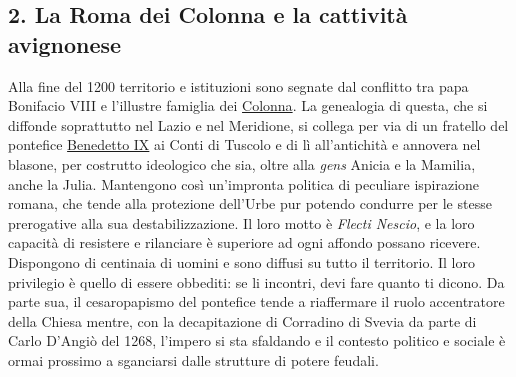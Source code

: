 \documentclass[
  letterpaper,
  DIV=11,
  numbers=noendperiod]{scrartcl}
\begin{document}
\hypertarget{la-roma-dei-colonna-e-la-cattivituxe0-avignonese}{%
\subsection{2. La Roma dei Colonna e la cattività
avignonese}\label{la-roma-dei-colonna-e-la-cattivituxe0-avignonese}}

Alla fine del 1200 territorio e istituzioni sono segnate dal conflitto
tra papa Bonifacio VIII e l'illustre famiglia dei
\href{2015-12-15-marcantonio-colonna-frascati-comandini.html}{Colonna}.
La genealogia di questa, che si diffonde soprattutto nel Lazio e nel
Meridione, si collega per via di un fratello del pontefice
\href{2013-04-02-benedetto-ix-tuscolo-comandini.html}{Benedetto IX} ai
Conti di Tuscolo e di lì all'antichità e annovera nel blasone, per
costrutto ideologico che sia, oltre alla \emph{gens} Anicia e la
Mamilia, anche la Julia. Mantengono così un'impronta politica di
peculiare ispirazione romana, che tende alla protezione dell'Urbe pur
potendo condurre per le stesse prerogative alla sua destabilizzazione.
Il loro motto è \emph{Flecti Nescio}, e la loro capacità di resistere e
rilanciare è superiore ad ogni affondo possano ricevere. Dispongono di
centinaia di uomini e sono diffusi su tutto il territorio. Il loro
privilegio è quello di essere obbediti: se li incontri, devi fare quanto
ti dicono. Da parte sua, il cesaropapismo del pontefice tende a
riaffermare il ruolo accentratore della Chiesa mentre, con la
decapitazione di Corradino di Svevia da parte di Carlo D'Angiò del 1268,
l'impero si sta sfaldando e il contesto politico e sociale è ormai
prossimo a sganciarsi dalle strutture di potere feudali.
\end{document}
